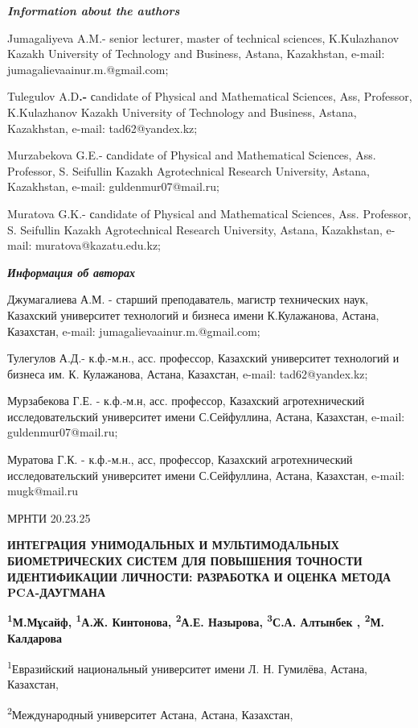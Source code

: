 \emph{\textbf{Information about the authors}}

Jumagaliyeva A.M.- senior lecturer, master of technical sciences,
K.Kulazhanov Kazakh University of Technology and Business, Astana,
Kazakhstan, e-mail: jumagalievaainur.m.@gmail.com;

Tulegulov A.D\textbf{.-} сandidate of Physical and Mathematical
Sciences, Ass, Professor, K.Kulazhanov Kazakh University of Technology
and Business, Astana, Kazakhstan, e-mail: tad62@yandex.kz;

Murzabekova G.E.- сandidate of Physical and Mathematical Sciences, Ass.
Professor, S. Seifullin Kazakh Agrotechnical Research University,
Astana, Kazakhstan, e-mail: guldenmur07@mail.ru;

Muratova G.K.- сandidate of Physical and Mathematical Sciences, Ass.
Professor, S. Seifullin Kazakh Agrotechnical Research University,
Astana, Kazakhstan, e-mail: muratova@kazatu.edu.kz;

\emph{\textbf{Информация об авторах}}

Джумагалиева А.М. - старший преподаватель, магистр технических наук,
Казахский университет технологий и бизнеса имени К.Кулажанова, Астана,
Казахстан, e-mail: jumagalievaainur.m.@gmail.com;

Тулегулов А.Д.- к.ф.-м.н., асс. профессор, Казахский университет
технологий и бизнеса им. К. Кулажанова, Астана, Казахстан, e-mail:
tad62@yandex.kz;

Мурзабекова Г.Е. - к.ф.-м.н, асс. профессор, Казахский агротехнический
исследовательский университет имени С.Сейфуллина, Астана, Казахстан,
e-mail: guldenmur07@mail.ru;

Муратова Г.К. - к.ф.-м.н., асс, профессор, Казахский агротехнический
исследовательский университет имени С.Сейфуллина, Астана, Казахстан,
e-mail: mugk@mail.ru

МРНТИ 20.23.25

\textbf{ИНТЕГРАЦИЯ УНИМОДАЛЬНЫХ И МУЛЬТИМОДАЛЬНЫХ БИОМЕТРИЧЕСКИХ СИСТЕМ
ДЛЯ ПОВЫШЕНИЯ ТОЧНОСТИ ИДЕНТИФИКАЦИИ ЛИЧНОСТИ: РАЗРАБОТКА И ОЦЕНКА
МЕТОДА PCA-ДАУГМАНА}

\textbf{\textsuperscript{1}М.Мұсайф, \textsuperscript{1}А.Ж. Кинтонова,
\textsuperscript{2}А.Е. Назырова, \textsuperscript{3}С.А. Алтынбек ,
\textsuperscript{2}М. Калдарова}

\textsuperscript{1}Евразийский национальный университет имени Л. Н.
Гумилёва, Астана, Казахстан,

\textsuperscript{2}Международный университет Астана, Астана, Казахстан,

